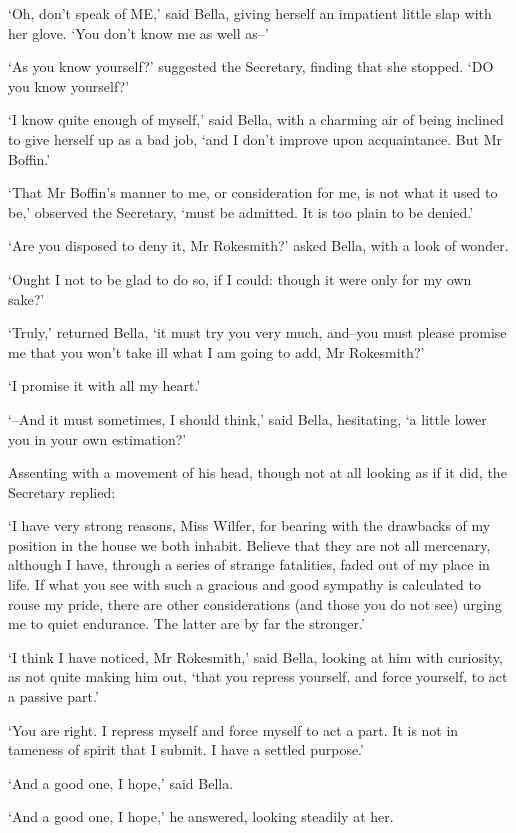 ‘Oh, don’t speak of ME,’ said Bella, giving herself an impatient little
slap with her glove. ‘You don’t know me as well as--’

‘As you know yourself?’ suggested the Secretary, finding that she
stopped. ‘DO you know yourself?’

‘I know quite enough of myself,’ said Bella, with a charming air of
being inclined to give herself up as a bad job, ‘and I don’t improve
upon acquaintance. But Mr Boffin.’

‘That Mr Boffin’s manner to me, or consideration for me, is not what it
used to be,’ observed the Secretary, ‘must be admitted. It is too plain
to be denied.’

‘Are you disposed to deny it, Mr Rokesmith?’ asked Bella, with a look of
wonder.

‘Ought I not to be glad to do so, if I could: though it were only for my
own sake?’

‘Truly,’ returned Bella, ‘it must try you very much, and--you must
please promise me that you won’t take ill what I am going to add, Mr
Rokesmith?’

‘I promise it with all my heart.’

‘--And it must sometimes, I should think,’ said Bella, hesitating, ‘a
little lower you in your own estimation?’

Assenting with a movement of his head, though not at all looking as if
it did, the Secretary replied:

‘I have very strong reasons, Miss Wilfer, for bearing with the drawbacks
of my position in the house we both inhabit. Believe that they are not
all mercenary, although I have, through a series of strange fatalities,
faded out of my place in life. If what you see with such a gracious
and good sympathy is calculated to rouse my pride, there are other
considerations (and those you do not see) urging me to quiet endurance.
The latter are by far the stronger.’

‘I think I have noticed, Mr Rokesmith,’ said Bella, looking at him with
curiosity, as not quite making him out, ‘that you repress yourself, and
force yourself, to act a passive part.’

‘You are right. I repress myself and force myself to act a part. It is
not in tameness of spirit that I submit. I have a settled purpose.’

‘And a good one, I hope,’ said Bella.

‘And a good one, I hope,’ he answered, looking steadily at her.

